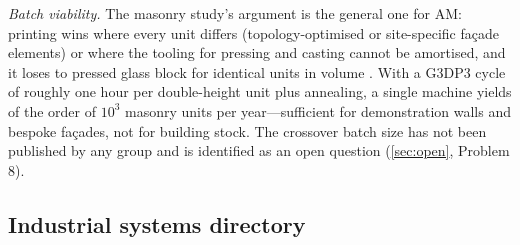 \emph{Batch viability.} The masonry study's argument is the general one for AM: printing wins where every unit differs (topology-optimised or site-specific fa\c{c}ade elements) or where the tooling for pressing and casting cannot be amortised, and it loses to pressed glass block for identical units in volume \citep{mit2024masonry}. With a G3DP3 cycle of roughly one hour per double-height unit plus annealing, a single machine yields of the order of \(10^{3}\) masonry units per year---sufficient for demonstration walls and bespoke fa\c{c}ades, not for building stock. The crossover batch size has not been published by any group and is identified as an open question (\cref{sec:open}, Problem 8).

\subsection{Industrial systems directory}
